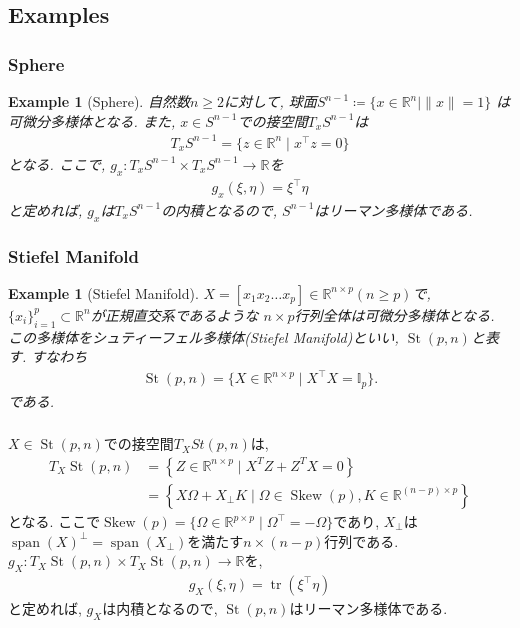 \documentclass[dvipdfmx,11pt]{beamer}		%
\newtheorem{exam}[defi]{Example}
\newcommand{\R}{\mathbb{R}}
\begin{document}
    \subsection{Examples}
    \begin{frame}\frametitle{Sphere}
        \begin{exam}[Sphere]
            自然数$n\geq2$に対して, 球面$S^{n - 1}\coloneqq\{x\in\R^n\mid\|x\| = 1\}$
            は可微分多様体となる. また, $x\in S^{n - 1}$での接空間$T_xS^{n-1}$は
            \begin{align*}
                T_xS^{n - 1} = \{z\in\R^n\mid x^{\top}z = 0\}
            \end{align*}
            となる. ここで, $g_x : T_xS^{n - 1}\times T_xS^{n - 1}\to\R$を
            \begin{align*}
                g_x(\xi, \eta) = \xi^{\top}\eta
            \end{align*}
            と定めれば, $g_x$は$T_xS^{n-1}$の内積となるので, $S^{n - 1}$はリーマン多様体である.
        \end{exam}
    \end{frame}
    \begin{frame}\frametitle{Stiefel Manifold}
        \begin{exam}[Stiefel Manifold]
            $X = [x_1x_2\ldots x_p]\in\R^{n\times p}(n\geq p)$で, $\{x_i\}_{i = 1}^p\subset\R^n$が正規直交系であるような
            $n\times p$行列全体は可微分多様体となる. この多様体をシュティーフェル多様体(Stiefel Manifold)といい, 
            $\operatorname{St}(p, n)$と表す. すなわち
            \begin{align*}
                \operatorname{St}(p, n) = \{X\in\R^{n\times p}\mid X^{\top}X = \mathbb{I}_{p}\}.
            \end{align*}
            である.
        \end{exam}
    \end{frame}

    \begin{frame}\frametitle{}
        $X\in\operatorname{St}(p, n)$での接空間$T_{X}St(p, n)$は, 
        \begin{align*}
            T_{X} \operatorname{St}(p, n)&=\left\{Z \in \mathbb{R}^{n \times p}\mid X^{T} Z+Z^{T} X=0\right\}\\
                                         &= \left\{X \Omega+X_{\perp} K\mid \Omega\in\operatorname{Skew}(p), K \in \mathbb{R}^{(n-p) \times p}\right\}
        \end{align*}
        となる. ここで$\operatorname{Skew}(p) = \{\Omega\in\R^{p\times p}\mid \Omega^{\top} = -\Omega\}$であり, 
        $X_{\perp}$は$\operatorname{span}(X)^{\perp} = \operatorname{span}(X_{\perp})$を満たす$n\times (n - p)$行列である.
        $g_{X} : T_{X}\operatorname{St}(p, n)\times T_{X}\operatorname{St}(p, n)\to\R$を,
        \begin{align*}
            g_{X}(\xi, \eta) = \operatorname{tr}(\xi^{\top} \eta)
        \end{align*}
        と定めれば, $g_{X}$は内積となるので, $\operatorname{St}(p, n)$はリーマン多様体である. 
    \end{frame}
\end{document}

